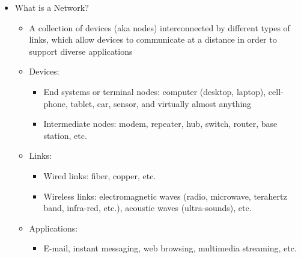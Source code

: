 \begin{itemize}

  \item What is a Network?

    \begin{itemize}

      \item A collection of devices (aka nodes) interconnected by different types of links, which allow devices to communicate at a distance in order to support diverse applications

      \item Devices:

        \begin{itemize}

          \item End systems or terminal nodes: computer (desktop, laptop), cell-phone, tablet, car, sensor, and virtually almost anything

          \item Intermediate nodes: modem, repeater, hub, switch, router, base station, etc.

        \end{itemize}

      \item Links:

        \begin{itemize}

          \item Wired links: fiber, copper, etc.

          \item Wireless links: electromagnetic waves (radio, microwave, terahertz band, infra-red, etc.), acoustic waves (ultra-sounds), etc.

        \end{itemize}

      \item Applications:

        \begin{itemize}

          \item E-mail, instant messaging, web browsing, multimedia streaming, etc.

        \end{itemize}

    \end{itemize}

\end{itemize}



